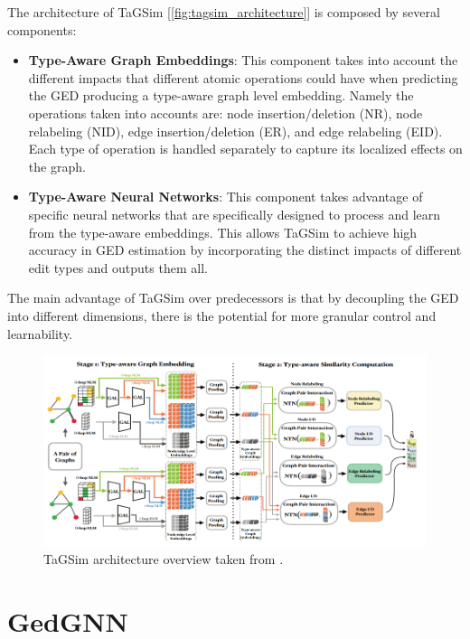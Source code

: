 \documentclass[../Thesis.tex]{subfiles}
\begin{document}
	The architecture of TaGSim [\autoref{fig:tagsim_architecture}] is composed by several components:
	
	\begin{itemize}
		\item \textbf{Type-Aware Graph Embeddings}: This component takes into account the different impacts that different atomic operations could have when predicting the GED producing a type-aware graph level embedding. Namely the operations taken into accounts are: node insertion/deletion (NR), node relabeling (NID), edge insertion/deletion (ER), and edge relabeling (EID). Each type of operation is handled separately to capture its localized effects on the graph.
		\item \textbf{Type-Aware Neural Networks}: This component takes advantage of specific neural networks that are specifically designed to process and learn from the type-aware embeddings. This allows TaGSim to achieve high accuracy in GED estimation by incorporating the distinct impacts of different edit types and outputs them all.
	\end{itemize}
	
	The main advantage of TaGSim over predecessors is that by decoupling the GED into different dimensions, there is the potential for more granular control and learnability.
	
	\begin{figure}[H]
		\centering
		\includegraphics[width=\textwidth]{Images/tagsim_architecture.png}
		\caption{TaGSim architecture overview taken from \cite{TaGSim_type_aware_graph_similarity_learning_and_computation}.}
		\label{fig:tagsim_architecture}
	\end{figure}

	\section{GedGNN}
	\label{sec:gedgnn}
	
\end{document}
